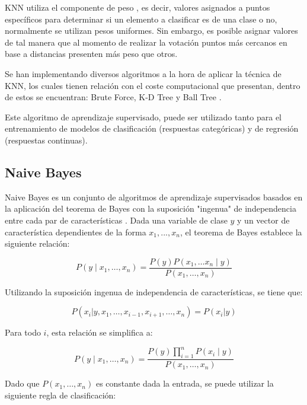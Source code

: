 KNN utiliza el componente de peso \cite{TAN2005667}, es decir, valores asignados a puntos específicos para determinar si un elemento a clasificar es de una clase o no, normalmente se utilizan pesos uniformes. Sin embargo, es posible asignar valores de tal manera que al momento de realizar la votación puntos más cercanos en base a distancias presenten más peso que otros.

Se han implementando diversos algoritmos a la hora de aplicar la técnica de KNN, los cuales tienen relación con el coste computacional que presentan, dentro de estos se encuentran: Brute Force, K-D Tree y Ball Tree \cite{pedregosa2011scikit}.

Este algoritmo de aprendizaje supervisado, puede ser utilizado tanto para el entrenamiento de modelos de clasificación (respuestas categóricas) y de regresión (respuestas continuas).

\subsection{Naive Bayes}

Naive Bayes es un conjunto de algoritmos de aprendizaje supervisados basados en la aplicación del teorema de Bayes con la suposición "ingenua" de independencia entre cada par de características \cite{zhang2004optimality}. Dada una variable de clase $y$ y un vector de característica dependientes de la forma $x_1,..., x_n$, el teorema de Bayes establece la siguiente relación:

\begin{equation}
	P(y \mid x_1, \dots, x_n) = \frac{P(y) P(x_1, \dots x_n \mid y)} {P(x_1, \dots, x_n)}
\end{equation}

Utilizando la suposición ingenua de independencia de características, se tiene que:

\begin{equation}
	P(x_i | y, x_1, \dots, x_{i-1}, x_{i+1}, \dots, x_n) = P(x_i | y)
\end{equation}

Para todo $i$, esta relación se simplifica a:

\begin{equation}
	P(y \mid x_1, \dots, x_n) = \frac{P(y) \prod_{i=1}^{n} P(x_i \mid y)} {P(x_1, \dots, x_n)}
\end{equation}

Dado que $P(x_1, \dots, x_n)$ es constante dada la entrada, se puede utilizar la siguiente regla de clasificación:

